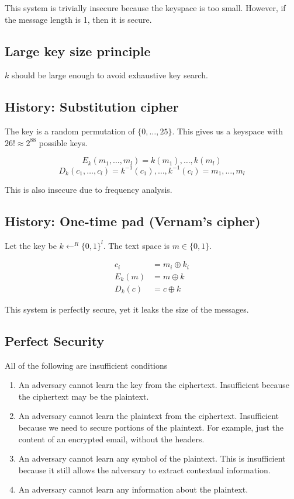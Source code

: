 \documentclass{idc_msc}
\DeclareMathOperator*{\xor}{\oplus}
\begin{document}
This system is trivially insecure because the keyspace is too small.
However, if the message length is 1, then it is secure.

\subsection{Large key size principle}

\(k\) should be large enough to avoid exhaustive key search.

\subsection{History: Substitution cipher}

The key is a random permutation of \(\{0, \ldots, 25\}\). This gives us a keyspace with \(26! \approx 2^88\) possible keys.

\[E_k(m_1, \ldots, m_l) = k(m_1), \ldots, k(m_l)\]
\[D_k(c_1, \ldots, c_l) = k^{-1}(c_1), \ldots, k^{-1}(c_l) = m_1, \ldots, m_l\]

This is also insecure due to frequency analysis.

\subsection{History: One-time pad (Vernam's cipher)}

Let the key be \(k \gets^R \{0,1\}^l\).
The text space is \(m \in \{0, 1\}\).

\[
\begin{aligned}
  c_i &= m_i \xor k_i \\
  E_k(m) &= m \xor k \\
  D_k(c) &= c \xor k
\end{aligned}
\]

This system is perfectly secure, yet it leaks the size of the messages.

\subsection{Perfect Security}

All of the following are insufficient conditions

\begin{enumerate}
  \item An adversary cannot learn the key from the ciphertext. Insufficient because the ciphertext may be the plaintext.
  \item An adversary cannot learn the plaintext from the ciphertext. Insufficient because we need to secure portions of the plaintext. For example, just the content of an encrypted email, without the headers.
  \item An adversary cannot learn any symbol of the plaintext. This is insufficient because it still allows the adversary to extract contextual information.
  \item An adversary cannot learn any information about the plaintext.
\end{enumerate}
\end{document}
